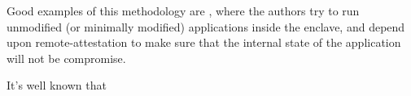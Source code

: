 \documentclass[11pt]{article}
\begin{document}
  Good examples of this methodology are \cite{Haven, Graphene, Scone},
  where the authors try to run unmodified (or minimally modified)
  applications inside the enclave, and depend upon remote-attestation
  to make sure that the internal state of the application will not be
  compromise.

  It's well known that


\end{document}
